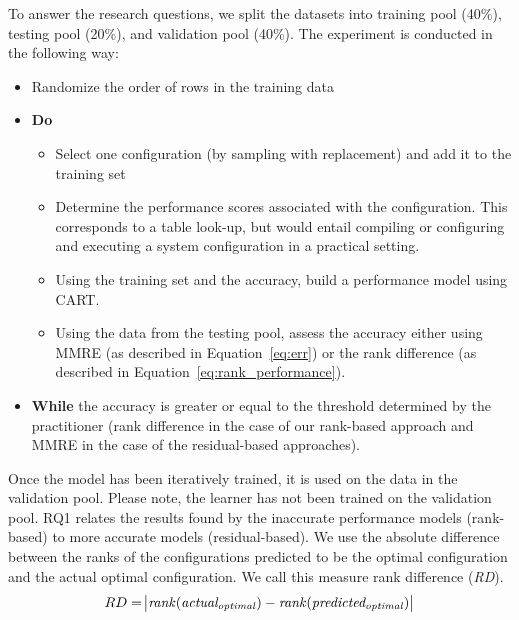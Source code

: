 To answer the research questions, we split the datasets into training pool (40\%), testing pool (20\%), and validation pool (40\%). The experiment is conducted in the following way:
\begin{itemize}
    \item Randomize the order of rows  in  the training data
    \item \textbf{Do}
    \begin{itemize}
        \item Select one configuration (by sampling with replacement) and add it to the training set
        \item Determine the performance scores associated with the configuration. This corresponds to  a table look-up, but would entail compiling or configuring and executing a system configuration in a practical setting.
        \item Using the training set and the accuracy, build a performance model using CART.
        \item Using the data from the testing pool, assess the accuracy either using MMRE (as described in Equation~\ref{eq:err}) or the rank difference (as described in Equation~\ref{eq:rank_performance}).         
    \end{itemize}
    \item \textbf{While} the accuracy is greater or equal to the threshold determined by the practitioner (rank difference in the case of our rank-based approach and MMRE in the case of the residual-based approaches).
\end{itemize}

Once the model has been iteratively trained, it is used on the data in the validation pool. Please note, the learner has not been trained on the validation pool.
RQ1 relates the results found by the inaccurate performance models (rank-based) to more accurate models (residual-based). We use the absolute difference between the ranks of the configurations predicted to be the optimal configuration and the actual optimal configuration. We call this measure rank difference (\textit{RD}).  
\begin{equation}\label{eq:rankdiff}
    \begin{split}
        RD &= \abs{\mathit{rank(actual_{optimal})} - \mathit{rank(predicted_{optimal})}}\\
    \end{split}
\end{equation}



